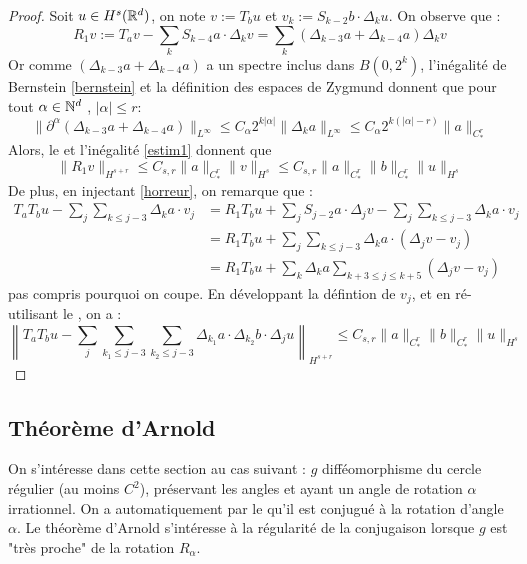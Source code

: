 \documentclass[11pt,a4paper]{article}
\begin{document}
\begin{proof}
Soit $u\in H^s(\mathbb R^d)$, on note $v:=T_bu$ et $v_k:=S_{k-2}b\cdot\Delta_ku$. On observe que :
\begin{equation}\label{horreur}
R_1v:=T_av-\sum_k S_{k-4}a\cdot\Delta_kv = \sum_k (\Delta_{k-3}a + \Delta_{k-4}a)\Delta_kv
\end{equation}
Or comme $(\Delta_{k-3}a + \Delta_{k-4}a)$ a un spectre inclus dans $B(0,2^k)$, l'inégalité de Bernstein \eqref{bernstein} et la définition des espaces de Zygmund donnent que pour tout $\alpha \in \mathbb N^d$ , $|\alpha| \leq r$:
\begin{equation*}
\|\partial^\alpha(\Delta_{k-3}a + \Delta_{k-4}a)\|_{L^\infty} \leq C_\alpha 2^{k|\alpha|}\|\Delta_ka\|_{L^\infty} \leq C_\alpha 2^{k(|\alpha|-r)} \|a\|_{C^r_*}
\end{equation*}
Alors, le  et l'inégalité \eqref{estim1} donnent que 
\begin{equation*}
\|R_1v\|_{H^{s+r}} \leq C_{s,r} \|a\|_{C^r_*} \|v\|_{H^s} \leq C_{s,r} \|a\|_{C^r_*} \|b\|_{C^r_*} \|u\|_{H^s}
\end{equation*}
De plus, en injectant \eqref{horreur}, on remarque que :
\begin{align*}
T_aT_bu - \sum_j \sum_{k \leq j-3} \Delta_ka\cdot v_j &= R_1T_bu + \sum_j S_{j-2}a\cdot\Delta_jv - \sum_j \sum_{k \leq j-3} \Delta_ka\cdot v_j \\
&=R_1T_bu + \sum_j \sum_{k \leq j-3} \Delta_ka\cdot (\Delta_jv - v_j) \\
&=R_1T_bu + \sum_k \Delta_ka \sum_{k+3 \leq j \leq k+5} (\Delta_jv - v_j) 
\end{align*}
pas compris pourquoi on coupe. En développant la défintion de $v_j$, et en ré-utilisant le , on a :
\begin{equation}
\left\| T_aT_bu - \sum_j \sum_{k_1 \leq j-3} \sum_{k_2\leq j-3} \Delta_{k_1}a\cdot \Delta_{k_2}b \cdot \Delta_j u \right\|_{H^{s+r}} \leq C_{s,r} \|a\|_{C^r_*} \|b\|_{C^r_*} \|u\|_{H^s}
\end{equation}
\end{proof}

\subsection{Théorème d'Arnold}
On s'intéresse dans cette section au cas suivant : $g$ difféomorphisme du cercle régulier (au moins $C^2$), préservant les angles et ayant un angle de rotation $\alpha$ irrationnel. On a automatiquement par le  qu'il est conjugué à la rotation d'angle $\alpha$. Le théorème d'Arnold s'intéresse à la régularité de la conjugaison lorsque $g$ est "très proche" de la rotation $R_\alpha$.
\end{document}
